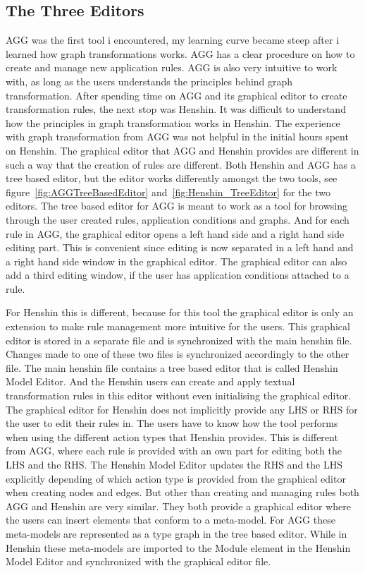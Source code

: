 \subsection{The Three Editors}
AGG was the first tool i encountered, my learning curve became steep after i
learned how graph transformations works. AGG has a clear procedure on how to create and
manage new application rules. AGG is also very intuitive to work with, as long
as the users understands the principles behind graph transformation.
After spending time on AGG and its graphical editor to create transformation rules, the next
stop was Henshin. It was difficult to understand how the principles in graph
transformation works in Henshin. The experience with graph transformation from
AGG was not helpful in the initial hours spent on Henshin. The graphical editor
that AGG and Henshin provides are different in such a way that the creation of
rules are different. Both Henshin and AGG has a tree based editor, but the
editor works differently amongst the two tools, see
figure~\ref{fig:AGGTreeBasedEditor} and~\ref{fig:Henshin_TreeEditor} for the
two editors. The tree based editor for AGG is meant to work as a tool for
browsing through the user created rules, application conditions and graphs. And
for each rule in AGG, the graphical editor opens a left hand side and a right
hand side editing part. This is convenient since editing is now separated in a
left hand and a right hand side window in the graphical editor. The graphical editor can also
add a third editing window, if the user has application conditions attached to a
rule. 

For Henshin this is different, because for this tool the graphical editor
is only an extension to make rule management more intuitive for the users. This
graphical editor is stored in a separate file and is synchronized with the main
henshin file. Changes made to one of these two files is synchronized
accordingly to the other file. The main henshin file contains a tree based
editor that is called Henshin Model Editor. And the Henshin users can create and
apply textual transformation rules in this editor without even initialising the
graphical editor. The graphical editor for Henshin does not implicitly provide
any LHS or RHS for the user to edit their rules in. The users have to know how the tool
performs when using the different action types that Henshin provides. This is
different from AGG, where each rule is provided with an own part for editing
both the LHS and the RHS. The Henshin Model Editor updates the RHS and the LHS
explicitly depending of which action type is provided from the graphical
editor when creating nodes and edges. But other than creating and managing
rules both AGG and Henshin are very similar. They both provide a graphical editor where
the users can insert elements that conform to a meta-model. For AGG these
meta-models are represented as a type graph in the tree based editor. While in
Henshin these meta-models are imported to the Module element in the Henshin Model
Editor and synchronized with the graphical editor file.

